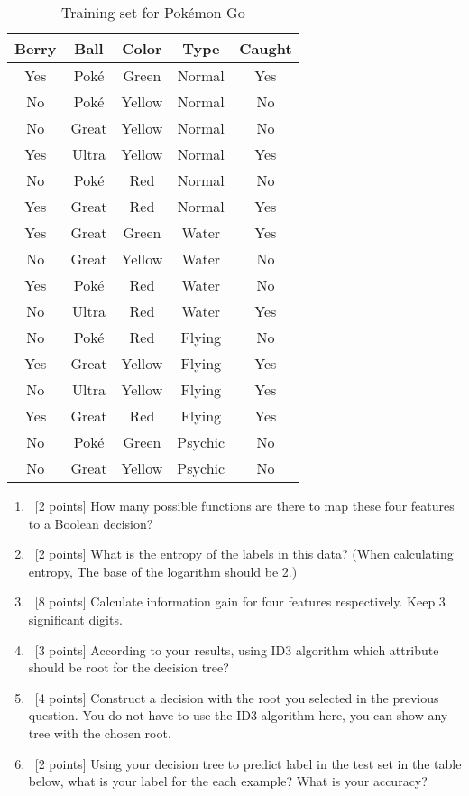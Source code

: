 \begin{enumerate}
\begin{table}[H]
\centering
\begin{tabular}{| c c c c | c |}
\hline
Berry& Ball & Color & Type & Caught\\
\hline
Yes & Pok\'e & Green & Normal & Yes \\
No & Pok\'e & Yellow & Normal & No \\
No & Great & Yellow & Normal & No \\
Yes & Ultra & Yellow & Normal & Yes \\
No & Pok\'e & Red & Normal & No \\
Yes & Great & Red & Normal & Yes \\
Yes & Great & Green & Water & Yes \\
No & Great & Yellow & Water & No \\
Yes & Pok\'e & Red & Water & No \\
No & Ultra & Red & Water & Yes \\
No & Pok\'e & Red & Flying  & No \\
Yes & Great & Yellow & Flying  & Yes \\
No & Ultra & Yellow & Flying & Yes \\
Yes & Great & Red & Flying  & Yes \\
No & Pok\'e & Green & Psychic & No \\
No & Great & Yellow & Psychic & No \\
\hline
\end{tabular}
\caption{Training set for Pok\'emon Go}
\end{table}
\begin{enumerate}
\item  ~[2 points] How many possible functions are there to map these four features to a Boolean decision? 
\item  ~[2 points]  What is the entropy of the labels in this data? (When calculating entropy, The base of the logarithm should be 2.)
\item  ~[8 points] Calculate information gain for four features respectively. Keep 3 significant digits.  
\item  ~[3 points] According to your results, using ID3 algorithm which attribute should be root for the decision tree?
\item   ~[4 points] Construct a decision with the root you selected in the previous question. You do not have to use the ID3 algorithm here, you can show any tree with the chosen root.
\item   ~[2 points] Using your decision tree to predict label in the test set in the table below, what is your label for the each example? What is your accuracy?


\end{enumerate}
\end{enumerate}
